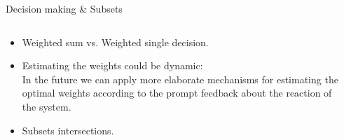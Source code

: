 \documentclass[8pt,mathserif,a4paper,oneside,pdf]{beamer}
\begin{document}
\begin{frame}[fragile]{Decision making \& Subsets}
  \begin{columns}
    \begin{column}[T]{5cm}
      \begin{itemize}
      \item
        Weighted sum vs. Weighted single decision.
      \item
        Estimating the weights could be dynamic:\\
        In the future we can apply more elaborate mechanisms for estimating the optimal weights according to the prompt feedback about the reaction of the system.
      \item
        Subsets intersections.
      \end{itemize}
    \end{column}
    \begin{column}[T]{7cm}
      {}
    \end{column}
  \end{columns}
\end{frame}
\end{document}
